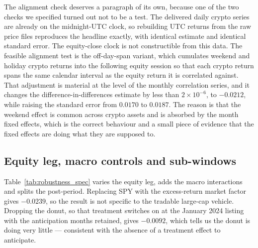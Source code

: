\documentclass[12pt,a4paper]{article}
\begin{document}


The alignment check deserves a paragraph of its own, because one of the two checks we specified turned out not to be a test. The delivered daily crypto series are already on the midnight-UTC clock, so rebuilding UTC returns from the raw price files reproduces the headline exactly, with identical estimate and identical standard error. The equity-close clock is not constructible from this data. The feasible alignment test is the off-day-span variant, which cumulates weekend and holiday crypto returns into the following equity session so that each crypto return spans the same calendar interval as the equity return it is correlated against. That adjustment is material at the level of the monthly correlation series, and it changes the difference-in-differences estimate by less than $2\times10^{-6}$, to
$-0.0212$, while raising the standard error from $0.0170$ to
$0.0187$. The reason is that the weekend effect is common across crypto assets and is absorbed by the month fixed effects, which is the correct behaviour and a small piece of evidence that the fixed effects are doing what they are supposed to.

\subsection{Equity leg, macro controls and sub-windows}

Table~\ref{tab:robustness_spec} varies the equity leg, adds the macro interactions and splits the post-period. Replacing SPY with the excess-return market factor gives
$-0.0239$, so the result is not specific to the tradable large-cap vehicle. Dropping the donut, so that treatment switches on at the January 2024 listing with the anticipation months retained, gives
$-0.0092$, which tells us the donut is doing very little — consistent with the absence of a treatment effect to anticipate.


\end{document}
